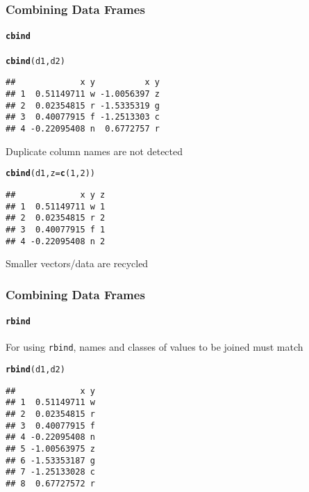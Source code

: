 \documentclass[paper=screen,mathserif]{beamer}\usepackage[]{graphicx}\usepackage[]{color}
\makeatletter
\newcommand{\hlnum}[1]{\textcolor[rgb]{0.686,0.059,0.569}{#1}}%
\newcommand{\hlstd}[1]{\textcolor[rgb]{0.345,0.345,0.345}{#1}}%
\newcommand{\hlkwc}[1]{\textcolor[rgb]{0.333,0.667,0.333}{#1}}%
\newcommand{\hlkwd}[1]{\textcolor[rgb]{0.737,0.353,0.396}{\textbf{#1}}}%
\newenvironment{kframe}{%
 \def\at@end@of@kframe{}%
 \ifinner\ifhmode%
  \def\at@end@of@kframe{\end{minipage}}%
  \begin{minipage}{\columnwidth}%
 \fi\fi%
 \def\FrameCommand##1{\hskip\@totalleftmargin \hskip-\fboxsep
 \colorbox{shadecolor}{##1}\hskip-\fboxsep
     \hskip-\linewidth \hskip-\@totalleftmargin \hskip\columnwidth}%
 \MakeFramed {\advance\hsize-\width
   \@totalleftmargin\z@ \linewidth\hsize
   \@setminipage}}%
 {\par\unskip\endMakeFramed%
 \at@end@of@kframe}
\newenvironment{knitrout}{}{} %
\newcommand{\ft}[1]{\frametitle{#1}}
\newcommand{\fst}[1]{\framesubtitle{#1}}
\makeatother
\begin{document}
\begin{frame}[fragile]
  \ft{Combining Data Frames}  
  \fst{{\tt cbind}}
\begin{knitrout}\scriptsize
{}\color{fgcolor}\begin{kframe}
\begin{alltt}
\hlkwd{cbind}\hlstd{(d1, d2)}
\end{alltt}
\begin{verbatim}
##             x y          x y
## 1  0.51149711 w -1.0056397 z
## 2  0.02354815 r -1.5335319 g
## 3  0.40077915 f -1.2513303 c
## 4 -0.22095408 n  0.6772757 r
\end{verbatim}
\end{kframe}
\end{knitrout}
{\small Duplicate column names are not detected}
\pause 
\begin{knitrout}\scriptsize
{}\color{fgcolor}\begin{kframe}
\begin{alltt}
\hlkwd{cbind}\hlstd{(d1,} \hlkwc{z} \hlstd{=} \hlkwd{c}\hlstd{(}\hlnum{1}\hlstd{,} \hlnum{2}\hlstd{))}
\end{alltt}
\begin{verbatim}
##             x y z
## 1  0.51149711 w 1
## 2  0.02354815 r 2
## 3  0.40077915 f 1
## 4 -0.22095408 n 2
\end{verbatim}
\end{kframe}
\end{knitrout}
{\small Smaller vectors/data are recycled}
\end{frame}

\begin{frame}[fragile]
  \ft{Combining Data Frames}  
  \fst{{\tt rbind}}
  
  For using \verb=rbind=, names and classes of values to be joined
  must match 
\begin{knitrout}\scriptsize
{}\color{fgcolor}\begin{kframe}
\begin{alltt}
\hlkwd{rbind}\hlstd{(d1, d2)}
\end{alltt}
\begin{verbatim}
##             x y
## 1  0.51149711 w
## 2  0.02354815 r
## 3  0.40077915 f
## 4 -0.22095408 n
## 5 -1.00563975 z
## 6 -1.53353187 g
## 7 -1.25133028 c
## 8  0.67727572 r
\end{verbatim}
\end{kframe}
\end{knitrout}
  
\end{frame}
\end{document}
